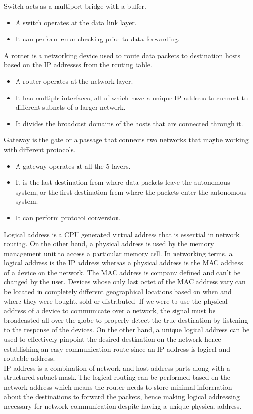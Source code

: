 \documentclass{home_assignment}
\begin{document}
Switch acts as a multiport bridge with a buffer.
\begin{itemize}
\item A switch operates at the data link layer.
\item It can perform error checking prior to data forwarding.
\end{itemize}

A router is a networking device used to route data packets to destination hosts based on the IP addresses from the routing table. 
\begin{itemize}
\item A router operates at the network layer.
\item It has multiple interfaces, all of which have a unique IP address to connect to different subnets of a larger network.
\item It divides the broadcast domains of the hosts that are connected through it.
\end{itemize}

Gateway is the gate or a passage that connects two networks that maybe working with different protocols.
\begin{itemize}
\item A gateway operates at all the 5 layers.
\item It is the last destination from where data packets leave the autonomous system, or the first destination from where the packets enter the autonomous system.
\item It can perform protocol conversion.
\end{itemize}
Logical address is a CPU generated virtual address that is essential in network routing. On the other hand, a physical address is used by the memory management unit to access a particular memory cell. In networking terms, a logical address is the IP address whereas a physical address is the MAC address of a device on the network. The MAC address is company defined and can't be changed by the user. Devices whose only last octet of the MAC address vary can be located in completely different geographical locations based on when and where they were bought, sold or distributed. If we were to use the physical address of a device to communicate over a network, the signal must be broadcasted all over the globe to properly detect the true destination by listening to the response of the devices. On the other hand, a unique logical address can be used to effectively pinpoint the desired destination on the network hence establishing an easy communication route since an IP address is logical and routable address.\\ IP address is a combination of network and host address parts along with a structured subnet mask. The logical routing can be performed based on the network address which means the router needs to store minimal information about the destinations to forward the packets, hence making logical addressing necessary for network communication despite having a unique physical address.
\end{document}
